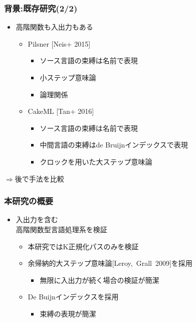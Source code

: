 \documentclass[dvipdfmx,cjk,xcolor=dvipsnames,envcountsect,notheorems,12pt]{beamer}
\theoremstyle{definition}
\begin{document}
\begin{frame}
	\frametitle{背景:既存研究(2/2)}
	\begin{itemize}
		\item 高階関数も入出力もある
			\begin{itemize}
				\item Pilsner [Neis+ 2015]
					\begin{itemize}
						\item ソース言語の束縛は名前で表現
						\item 小ステップ意味論
						\item 論理関係
					\end{itemize}
				\item CakeML [Tan+ 2016]
					\begin{itemize}
						\item ソース言語の束縛は名前で表現
						\item 中間言語の束縛はde Bruijnインデックスで表現
						\item クロックを用いた大ステップ意味論
					\end{itemize}
			\end{itemize}
	\end{itemize}
	\begin{flushright}
		\Large $\Rightarrow$後で手法を比較
	\end{flushright}
\end{frame}

\begin{frame}
	\frametitle{本研究の概要}
	\begin{itemize}
		\item 入出力を含む\\高階関数型言語処理系を検証
			\begin{itemize}
				\item 本研究ではK正規化パスのみを検証
				\item 余帰納的大ステップ意味論\mbox{[Leroy, Grall 2009]}を採用
					\begin{itemize}
						\item 無限に入出力が続く場合の検証が簡潔
					\end{itemize}
				\item De Buijnインデックスを採用
					\begin{itemize}
						\item 束縛の表現が簡潔
					\end{itemize}
			\end{itemize}
	\end{itemize}
\end{frame}
\end{document}
